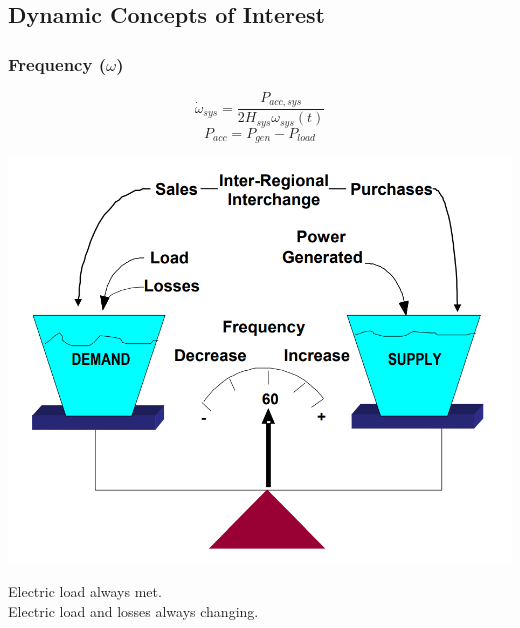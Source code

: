 \documentclass[14pt, unknownkeysallowed]{beamer}
\begin{document}
\subsection{Dynamic Concepts of Interest}
\begin{frame}
\frametitle{Frequency ($\omega$)}
\begin{minipage}[t][.55\textheight][t]{\textwidth}
	\begin{minipage}{.4\linewidth}
\vspace{-2em}
\[ \dot{\omega}_{sys} = \dfrac{P_{acc, sys}}{2H_{sys}\omega_{sys}(t) } \]
\[ P_{acc} = P_{gen} - P_{load} \]
	
\end{minipage}%
\begin{minipage}{.6\linewidth}
\vspace{-2em}
    \begin{center}
     \includegraphics[width=\linewidth]{freqScale}   {\tiny\cite{freqScale}}%
     \end{center}
\end{minipage}
\end{minipage}
Electric load always met.\\
\vspace{.5 em}
Electric load and losses always changing.
\end{frame}
\end{document}
